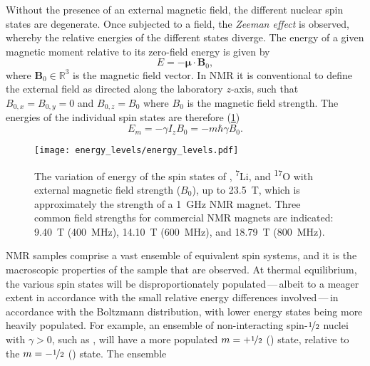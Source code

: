 Without the presence of an external magnetic field, the different nuclear spin
states are degenerate. Once subjected to a field, the \emph{Zeeman effect} is
observed, whereby the relative energies of the different states diverge. The
energy of a given magnetic moment relative to its zero-field energy is given by
\begin{equation}
  E = - \symbf{\mu} \cdot \symbf{B}_0,
\end{equation}
where $\symbf{B}_0 \in \mathbb{R}^3$ is the magnetic field vector. In \ac{NMR}
it is conventional to define the external field as directed along the
laboratory $z$-axis, such that $B_{0,x} = B_{0,y} = 0$ and $B_{0,z} = B_0$
where $B_0$ is the magnetic field strength. The energies of the individual spin
states are therefore (\cref{fig:energy_levels})
\begin{equation}
  E_m = - \gamma I_z B_0 = -m \hbar \gamma B_0.
\end{equation}
\begin{figure}%
    \centering%
    \texttt{[image: energy\_levels/energy\_levels.pdf]}%
    \caption[%
        The variation of energy of the spin states of \proton,
        \textsuperscript{7}Li, and \textsuperscript{17}O with external magnetic
        field strength.
    ]{%
        The variation of energy of the spin states of \proton,
        \textsuperscript{7}Li, and \textsuperscript{17}O with external magnetic
        field strength ($B_0$), up to \qty{23.5}{\tesla}, which is
        approximately the strength of a \qty{1}{\giga \hertz} \ac{NMR} magnet.
        Three common field strengths for commercial NMR magnets are indicated:
        \qty{9.40}{\tesla} (\qty{400}{\mega\hertz}), \qty{14.10}{\tesla}
        (\qty{600}{\mega\hertz}), and \qty{18.79}{\tesla}
        (\qty{800}{\mega\hertz}).
    }%
    \label{fig:energy_levels}%
\end{figure}%
\ac{NMR} samples comprise a vast ensemble of equivalent spin systems, and it is
the macroscopic properties of the sample that are observed.
At thermal equilibrium, the various spin states will be disproportionately
populated\,---\,albeit to a meager extent in accordance with the small
relative energy differences involved\,---\,in accordance with the Boltzmann
distribution, with lower energy states being more heavily populated. For
example, an ensemble of
non-interacting spin-$\nicefrac{1}{2}$ nuclei with $\gamma > 0$, such as
, will have a more populated $m = +\nicefrac{1}{2}$ (\textalpha) state,
relative to the $m = -\nicefrac{1}{2}$ (\textbeta) state.  The ensemble
